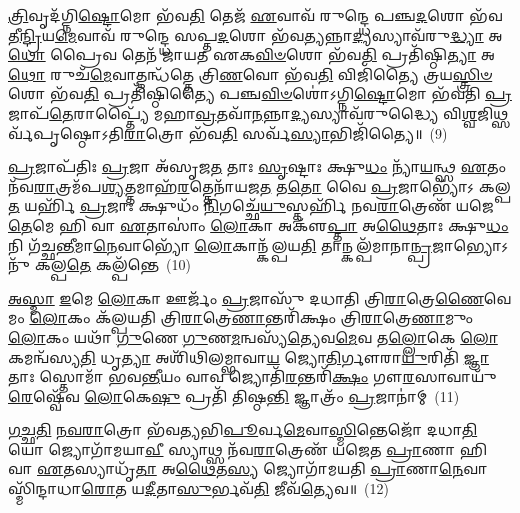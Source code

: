 \-\ul{𑌤𑍍𑌰𑌿}\-𑌵𑍃𑌦᳴𑌗𑍍𑌨𑌿\-\ul{𑌷𑍍𑌟𑍋}\-𑌮𑍋 𑌭᳴𑌵\-\ul{𑌤𑌿} 𑌤𑍇𑌜᳴ \ul{𑌏}\-𑌵𑌾𑌵᳴ 𑌰𑍁𑌨𑍍𑌦𑍍𑌧𑍇 𑌪𑌞𑍍𑌚\-\ul{𑌦}\-𑌶𑍋 𑌭᳴𑌵𑌤𑍀\-\ul{𑌨𑍍𑌦𑍍𑌰𑌿}\-𑌯\-\ul{𑌮𑍇}\-𑌵𑌾𑌵᳴ 𑌰𑍁𑌨𑍍𑌦𑍍𑌧𑍇 𑌸𑌪𑍍𑌤\-\ul{𑌦}\-𑌶𑍋 𑌭᳴𑌵\-\ul{𑌤𑍍𑌯}\-𑌨𑍍𑌨𑌾\-\ul{𑌦𑍍𑌯}\-𑌸𑍍𑌯𑌾𑌵᳴𑌰𑍁\-\ul{𑌦𑍍𑌧𑍍𑌯𑌾} 𑌅\-\ul{𑌥𑍋} 𑌪𑍍𑌰𑍈𑌵 𑌤𑍇𑌨᳴ 𑌜𑌾𑌯𑌤 𑌏𑌕\-\ul{𑌵𑌿}\-\-\ul{𑍞}\-𑌶𑍋 𑌭᳴𑌵\-\ul{𑌤𑌿} 𑌪𑍍𑌰𑌤𑌿᳴𑌷𑍍𑌠𑌿\-\ul{𑌤𑍍𑌯𑌾} 𑌅\-\ul{𑌥𑍋} 𑌰𑍁𑌚᳴\-\ul{𑌮𑍇}\-𑌵𑌾𑌤𑍍𑌮𑌨𑍍𑌧᳴𑌤𑍍𑌤𑍇 𑌤𑍍𑌰𑌿\-\ul{𑌣}\-𑌵𑍋 𑌭᳴𑌵\-\ul{𑌤𑌿} 𑌵𑌿𑌜𑌿᳴𑌤𑍍𑌯𑍈 𑌤𑍍𑌰𑌯\-\ul{𑌸𑍍𑌤𑍍𑌰𑌿}\-\-\ul{𑍞}\-𑌶𑍋 𑌭᳴𑌵\-\ul{𑌤𑌿} 𑌪𑍍𑌰𑌤𑌿᳴𑌷𑍍𑌠𑌿𑌤𑍍𑌯𑍈 𑌪𑌞𑍍𑌚\-\ul{𑌵𑌿}\-\-\ul{𑍞}\-𑌶𑍋॑\-𑌽𑌗𑍍𑌨𑌿\-\ul{𑌷𑍍𑌟𑍋}\-𑌮𑍋 𑌭᳴𑌵𑌤𑌿 \ul{𑌪𑍍𑌰}\-𑌜𑌾𑌪᳴\-\ul{𑌤𑍇}\-𑌰𑌾𑌪𑍍𑌤𑍍𑌯𑍈᳴ 𑌮𑌹𑌾\-\ul{𑌵𑍍𑌰}\-𑌤𑌵𑌾᳴\-\ul{𑌨}\-𑌨𑍍𑌨𑌾\-\ul{𑌦𑍍𑌯}\-𑌸𑍍𑌯𑌾𑌵᳴𑌰𑍁𑌦𑍍𑌧𑍍𑌯𑍈 𑌵𑌿\-\ul{𑌶𑍍𑌵}\-𑌜𑌿𑌥𑍍𑌸𑌰𑍍𑌵᳴𑌪𑍃𑌷𑍍𑌠𑍋\-𑌽𑌤𑌿\-\ul{𑌰𑌾}\-𑌤𑍍𑌰𑍋 𑌭᳴𑌵\-\ul{𑌤𑌿} 𑌸𑌰𑍍𑌵᳴\-\ul{𑌸𑍍𑌯𑌾}\-𑌭𑌿𑌜𑌿᳴𑌤𑍍𑌯𑍈॥~(9)

{\anuvakamend[{\-\ul{𑌦𑌿}\-𑌗𑍍𑌭𑍍𑌯 \ul{𑌏}\-𑌵 𑌬𑍍𑌰᳴𑌹𑍍𑌮𑌵\-\ul{𑌰𑍍𑌚}\-𑌸𑌮𑌵᳴\-𑌰𑍁\-\ul{𑌨𑍍𑌧𑍇}\-\-𑌽𑌭𑌿𑌜𑌿᳴𑌤𑍍𑌯𑍈}]}%

\-\ul{𑌪𑍍𑌰}\-𑌜𑌾𑌪᳴𑌤𑌿𑌃 \ul{𑌪𑍍𑌰}\-𑌜𑌾 𑌅᳴𑌸𑍃𑌜\-\ul{𑌤} 𑌤𑌾𑌃 \ul{𑌸𑍃}\-𑌷𑍍𑌟𑌾𑌃 𑌕𑍍𑌷𑍁\-\ul{𑌧𑌂} 𑌨𑍍𑌯𑌾᳴\-\ul{𑌯}\-𑌨𑍍𑌥𑍍𑌸 \ul{𑌏}\-𑌤𑌂 𑌨᳴𑌵\-\ul{𑌰𑌾}\-𑌤𑍍𑌰𑌮᳴𑌪\-\ul{𑌶𑍍𑌯}\-𑌤𑍍𑌤𑌮𑌾𑌹᳴\-\ul{𑌰}\-𑌤𑍍𑌤𑍇𑌨𑌾᳴𑌯𑌜\-\ul{𑌤} 𑌤\-\ul{𑌤𑍋} 𑌵𑍈 \ul{𑌪𑍍𑌰}\-𑌜𑌾𑌭𑍍𑌯𑍋᳴\-𑌽 𑌕𑌲𑍍𑌪\-\ul{𑌤} 𑌯𑌰𑍍\mbox{}𑌹𑌿᳴ \ul{𑌪𑍍𑌰}\-𑌜𑌾𑌃 𑌕𑍍𑌷𑍁𑌧𑌂᳴ \ul{𑌨𑌿}\-𑌗𑌚𑍍𑌛𑍇᳴\-\ul{𑌯𑍁}\-𑌸𑍍𑌤𑌰𑍍\mbox{}𑌹𑌿᳴ 𑌨𑌵\-\ul{𑌰𑌾}\-𑌤𑍍𑌰𑍇𑌣᳴ 𑌯𑌜𑍇\-\ul{𑌤𑍇}\-𑌮𑍇 𑌹𑌿 𑌵𑌾 \ul{𑌏}\-𑌤𑌾𑌸𑌾𑌂॑ \ul{𑌲𑍋}\-𑌕𑌾 𑌅𑌕𑍢᳴\-\ul{𑌪𑍍𑌤𑌾} 𑌅\-\ul{𑌥𑍈}\-𑌤𑌾𑌃 𑌕𑍍𑌷𑍁\-\ul{𑌧𑌂} 𑌨𑌿 𑌗᳴𑌚𑍍𑌛\-\ul{𑌨𑍍𑌤𑍀}\-𑌮𑌾\-\ul{𑌨𑍇}\-𑌵𑌾𑌭𑍍𑌯𑍋᳴ \ul{𑌲𑍋}\-𑌕𑌾𑌨𑍍𑌕᳴𑌲𑍍𑌪𑌯\-\ul{𑌤𑌿} 𑌤𑌾𑌨𑍍𑌕𑌲𑍍𑌪᳴𑌮𑌾𑌨𑌾\-\ul{𑌨𑍍𑌪𑍍𑌰}\-𑌜𑌾𑌭𑍍𑌯𑍋\-𑌽𑌨𑍁᳴ 𑌕𑌲𑍍𑌪\-\ul{𑌤𑍇} 𑌕𑌲𑍍𑌪᳴𑌨𑍍𑌤𑍇~(10)

\-\ul{𑌅}\-\-\ul{𑌸𑍍𑌮𑌾} \ul{𑌇}\-𑌮𑍇 \ul{𑌲𑍋}\-𑌕𑌾 𑌊𑌰𑍍𑌜𑌂᳴ \ul{𑌪𑍍𑌰}\-𑌜𑌾𑌸𑍁᳴ 𑌦𑌧𑌾𑌤𑌿 𑌤𑍍𑌰𑌿\-\ul{𑌰𑌾}\-𑌤𑍍𑌰𑍇\-\ul{𑌣𑍈}\-𑌵𑍇𑌮𑌂 \ul{𑌲𑍋}\-𑌕𑌂 𑌕᳴𑌲𑍍𑌪𑌯𑌤𑌿 𑌤𑍍𑌰𑌿\-\ul{𑌰𑌾}\-𑌤𑍍𑌰𑍇\-\ul{𑌣𑌾}\-𑌨𑍍𑌤𑌰𑌿᳴𑌕𑍍𑌷𑌂 𑌤𑍍𑌰𑌿\-\ul{𑌰𑌾}\-𑌤𑍍𑌰𑍇\-\ul{𑌣𑌾}\-𑌮𑍁𑌂 \ul{𑌲𑍋}\-𑌕𑌂 𑌯𑌥𑌾᳴ \ul{𑌗𑍁}\-𑌣𑍇 \ul{𑌗𑍁}\-𑌣\-\ul{𑌮}\-𑌨𑍍𑌵𑌸𑍍𑌯᳴\-\ul{𑌤𑍍𑌯𑍇}\-𑌵\-\ul{𑌮𑍇}\-𑌵 𑌤\-\ul{𑌲𑍍𑌲𑍋}\-𑌕𑍇 \ul{𑌲𑍋}\-𑌕𑌮𑌨𑍍𑌵᳴𑌸𑍍𑌯\-\ul{𑌤𑌿} 𑌧𑍃\-\ul{𑌤𑍍𑌯𑌾} 𑌅𑌶𑌿᳴𑌥𑌿𑌲𑌮𑍍𑌭𑌾𑌵𑌾\-\ul{𑌯} 𑌜𑍍𑌯𑍋\-\ul{𑌤𑌿}\-𑌰𑍍𑌗𑍗𑌰𑌾\-\ul{𑌯𑍁}\-𑌰𑌿𑌤𑌿᳴ \ul{𑌜𑍍𑌞𑌾}\-𑌤𑌾𑌃 𑌸𑍍𑌤𑍋𑌮𑌾᳴ 𑌭𑌵\-\ul{𑌨𑍍𑌤𑍀}\-𑌯𑌂 𑌵𑌾𑌵 𑌜𑍍𑌯𑍋𑌤𑌿᳴\-\ul{𑌰}\-𑌨𑍍𑌤𑌰𑌿᳴\-\ul{𑌕𑍍𑌷𑌂} 𑌗𑍗\-\ul{𑌰}\-𑌸𑌾𑌵𑌾𑌯𑍁᳴\-\ul{𑌰𑍇}\-𑌷𑍍𑌵𑍇᳴𑌵 \ul{𑌲𑍋}\-𑌕𑍇\-\ul{𑌷𑍁} 𑌪𑍍𑌰𑌤𑌿᳴ 𑌤𑌿𑌷𑍍𑌠\-\ul{𑌨𑍍𑌤𑌿} 𑌜𑍍𑌞𑌾𑌤𑍍𑌰𑌂᳴ \ul{𑌪𑍍𑌰}\-𑌜𑌾𑌨𑌾॑𑌮𑍍~(11)

\-\ul{𑌗}\-\-\ul{𑌚𑍍𑌛}\-\-\ul{𑌤𑌿} \ul{𑌨}\-\-\ul{𑌵}\-\-\ul{𑌰𑌾}\-𑌤𑍍𑌰𑍋 𑌭᳴𑌵𑌤𑍍𑌯𑌭𑌿\-\ul{𑌪𑍂}\-𑌰𑍍𑌵\-\ul{𑌮𑍇}\-𑌵𑌾\-\ul{𑌸𑍍𑌮𑌿}\-𑌨𑍍𑌤𑍇𑌜𑍋᳴ 𑌦𑌧𑌾\-\ul{𑌤𑌿} 𑌯𑍋 𑌜𑍍𑌯𑍋𑌗𑌾᳴𑌮𑌯𑌾\-\ul{𑌵𑍀} 𑌸𑍍𑌯𑌾𑌥𑍍𑌸 𑌨᳴𑌵\-\ul{𑌰𑌾}\-𑌤𑍍𑌰𑍇𑌣᳴ 𑌯𑌜𑍇𑌤 \ul{𑌪𑍍𑌰𑌾}\-𑌣𑌾 𑌹𑌿 𑌵𑌾 \ul{𑌏}\-𑌤𑌸𑍍𑌯𑌾𑌧𑍃᳴\-\ul{𑌤𑌾} 𑌅\-\ul{𑌥𑍈}\-𑌤\-\ul{𑌸𑍍𑌯} 𑌜𑍍𑌯𑍋𑌗𑌾᳴𑌮𑌯𑌤𑌿 \ul{𑌪𑍍𑌰𑌾}\-𑌣𑌾\-\ul{𑌨𑍇}\-𑌵𑌾𑌸𑍍𑌮𑌿᳴𑌨𑍍𑌦𑌾𑌧𑌾\-\ul{𑌰𑍋}\-𑌤 𑌯\-\ul{𑌦𑍀}\-𑌤𑌾\-\ul{𑌸𑍁}\-𑌰𑍍𑌭𑌵᳴\-\ul{𑌤𑌿} 𑌜𑍀𑌵᳴\-\ul{𑌤𑍍𑌯𑍇}\-𑌵॥~(12)

{\anuvakamend[{𑌕𑌲𑍍𑌪᳴𑌨𑍍𑌤𑍇 \ul{𑌪𑍍𑌰}\-𑌜𑌾\-\ul{𑌨𑌾}\-𑌨𑍍𑌤𑍍𑌰𑌯᳴𑌸𑍍𑌤𑍍𑌰𑌿𑍞𑌶𑌚𑍍𑌚}]}%

